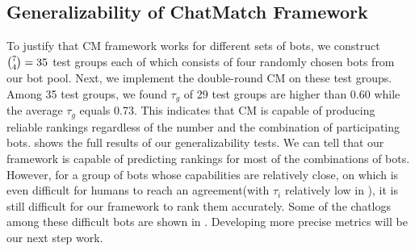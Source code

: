 \subsection{Generalizability of ChatMatch Framework}
\label{sec:four}
To justify that CM framework works for different sets of bots,
we construct $\tbinom{7}{4} = 35$ test groups each of which consists of four randomly
chosen bots from our bot pool.
Next, we implement the double-round CM on
these test groups.
Among 35 test groups, we found $\tau_g$ of 29 test groups are higher than 0.60 while the average $\tau_g$ equals
0.73. 
This indicates that CM is capable
of producing reliable rankings regardless
of the number and the combination of
participating bots.
 shows the full results of our generalizability tests. 
We can tell that our framework is capable of predicting rankings for most of the combinations of bots. 
However, for a group of bots whose capabilities are relatively close, on which is even difficult for humans to reach an agreement(with $\tau_i$ relatively low in ), it is still difficult for our framework to rank them
accurately. 
Some of the chatlogs among these difficult bots are shown in . Developing more precise metrics will be our next step work. 
